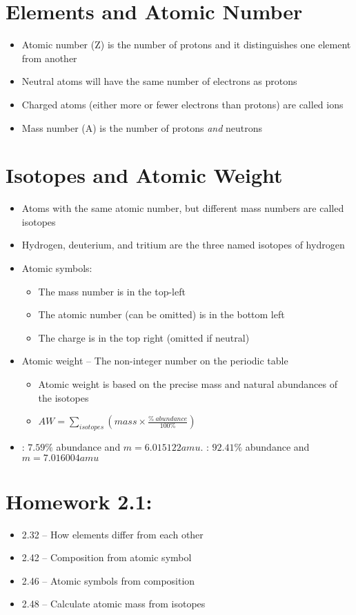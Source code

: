 \documentclass[12pt, openany, letterpaper]{memoir}
\begin{document}
\section{Elements and Atomic Number}
\begin{itemize}
	\item Atomic number (Z) is the number of protons and it distinguishes one element from another
	\item Neutral atoms will have the same number of electrons as protons
	\item Charged atoms (either more or fewer electrons than protons) are called ions
	\item Mass number (A) is the number of protons \emph{and} neutrons
\end{itemize}
\section{Isotopes and Atomic Weight}
\begin{itemize}
	\item Atoms with the same atomic number, but different mass numbers are called isotopes
	\item Hydrogen, deuterium, and tritium are the three named isotopes of hydrogen
	\item Atomic symbols: 
	      \begin{itemize}
		      \item The mass number is in the top-left
		      \item The atomic number (can be omitted) is in the bottom left
		      \item The charge is in the top right (omitted if neutral)
	      \end{itemize}
	\item Atomic weight -- The non-integer number on the periodic table
	      \begin{itemize}
		      \item Atomic weight is based on the precise mass and natural abundances of the isotopes
		      \item $AW=\sum\limits_{isotopes}\left(mass\times \frac{\%~abundance}{100\%}\right)$
	      \end{itemize}
	\item {}: $7.59\%$ abundance and $m=6.015122amu$. : $92.41\%$ abundance and $m=7.016004amu$
\end{itemize}

\section*{Homework 2.1:}
\begin{itemize}
	\item 2.32 -- How elements differ from each other
	\item 2.42 -- Composition from atomic symbol
	\item 2.46 -- Atomic symbols from composition
	\item 2.48 -- Calculate atomic mass from isotopes
\end{itemize}
\end{document}
